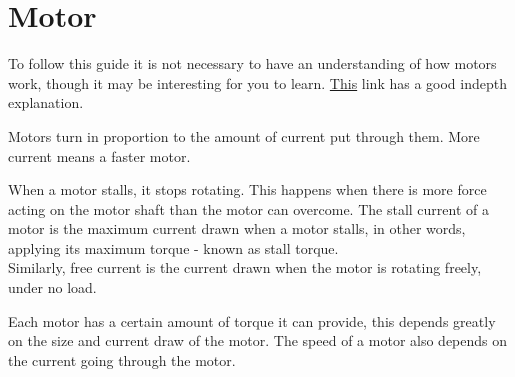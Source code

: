 \documentclass[../TinyBot.tex]{subfiles}
\begin{document}
    
\section{Motor} \label{sec:motor}

To follow this guide it is not necessary to have an understanding of how motors work, though it may be interesting for you to learn. \href{https://www.explainthatstuff.com/electricmotors.html}{This} link has a good indepth explanation. 

\bigskip

Motors turn in proportion to the amount of current put through them. More current means a faster motor. 

When a motor stalls, it stops rotating. This happens when there is more force acting on the motor shaft than the motor can overcome. The stall current of a motor is the maximum current drawn when a motor stalls, in other words, applying its maximum torque - known as stall torque. \\

Similarly, free current is the current drawn when the motor is rotating freely, under no load. 

\bigskip


Each motor has a certain amount of torque it can provide, this depends greatly on the size and current draw of the motor. The speed of a motor also depends on the current going through the motor. 

\end{document}
